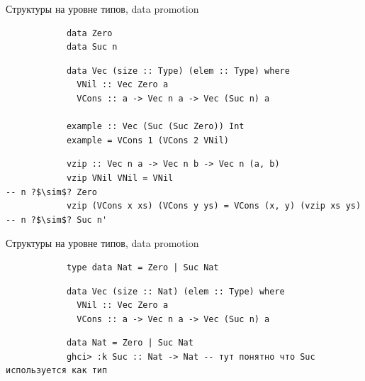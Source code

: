     \begin{frame}[fragile]{Структуры на уровне типов, data promotion}
        \pause
        \begin{verbatim}
            data Zero
            data Suc n
        \end{verbatim}

        \pause\hspace{2em}
        \begin{verbatim}
            data Vec (size :: Type) (elem :: Type) where
              VNil :: Vec Zero a
              VCons :: a -> Vec n a -> Vec (Suc n) a

            example :: Vec (Suc (Suc Zero)) Int
            example = VCons 1 (VCons 2 VNil)
        \end{verbatim}

        \pause\hspace{2em}
        \begin{verbatim}
            vzip :: Vec n a -> Vec n b -> Vec n (a, b)
            vzip VNil VNil = VNil                                      -- n ?$\sim$? Zero
            vzip (VCons x xs) (VCons y ys) = VCons (x, y) (vzip xs ys) -- n ?$\sim$? Suc n'
        \end{verbatim}
    \end{frame}

    \begin{frame}[fragile]{Структуры на уровне типов, data promotion}
        \pause
        \begin{verbatim}
            type data Nat = Zero | Suc Nat
        \end{verbatim}

        \pause\hspace{2em}
        \begin{verbatim}
            data Vec (size :: Nat) (elem :: Type) where
              VNil :: Vec Zero a
              VCons :: a -> Vec n a -> Vec (Suc n) a
        \end{verbatim}

        \pause\hspace{2em}
        \begin{verbatim}
            data Nat = Zero | Suc Nat
            ghci> :k Suc :: Nat -> Nat -- тут понятно что Suc используется как тип
        \end{verbatim}
    \end{frame}

